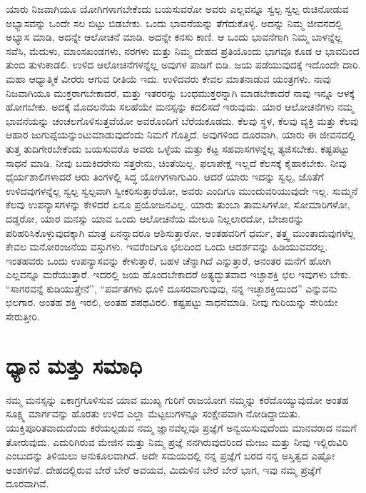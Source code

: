 ಯಾರು ನಿಜವಾಗಿಯೂ ಯೋಗಿಗಳಾಗಬೇಕೆಂದು ಬಯಸುವರೋ ಅವರು ಎಲ್ಲವನ್ನೂ ಸ್ವಲ್ಪ ಸ್ವಲ್ಪ ರುಚಿನೋಡುವ ಅಭ್ಯಾಸವನ್ನು ಒಂದೇ ಸಲ ಬಿಟ್ಟು ಬಿಡಬೇಕು. ಒಂದು ಭಾವನೆಯನ್ನು ತೆಗೆದುಕೊಳ್ಳಿ. ಅದನ್ನು ನಿಮ್ಮ ಜೀವನದಲ್ಲಿ ಅಭ್ಯಾಸ ಮಾಡಿ, ಅದನ್ನೇ ಆಲೋಚನೆ ಮಾಡಿ. ಅದನ್ನೇ ಕನಸು ಕಾಣಿ. ಆ ಒಂದು ಭಾವನೆಗಾಗಿ ನಿಮ್ಮ ಬಾಳನ್ನೆಲ್ಲ ಸವೆಸಿ, ಮೆದುಳು, ಮಾಂಸಖಂಡಗಳು, ನರಗಳು ಮತ್ತು ನಿಮ್ಮ ದೇಹದ ಪ್ರತಿಯೊಂದು ಭಾಗವೂ ಕೂಡ ಆ ಭಾವದಿಂದ ತುಂಬಿ ತುಳುಕಾಡಲಿ. ಉಳಿದ ಆಲೋಚನೆಗಳನ್ನೆಲ್ಲ ಅವುಗಳ ಪಾಡಿಗೆ ಬಿಡಿ. ಜಯ ಪಡೆಯುವುದಕ್ಕೆ ಇದೊಂದೇ ದಾರಿ. ಮಹಾ ಆಧ್ಯಾತ್ಮಿಕ ವೀರರು ಆಗುವ ರೀತಿಯೆ ಇದು. ಉಳಿದವರು ಕೇವಲ ಮಾತನಾಡುವ ಯಂತ್ರಗಳು. ನಾವು ನಿಜವಾಗಿಯೂ ಮುಕ್ತರಾಗಬೇಕಾದರೆ, ಮತ್ತು ಇತರರನ್ನು ಬಂಧಮುಕ್ತರನ್ನಾಗಿ ಮಾಡಬೇಕಾದರೆ ನಾವು ಇನ್ನೂ ಆಳಕ್ಕೆ ಹೋಗಬೇಕು. ಅದಕ್ಕೆ ಮೊದಲನೆಯ ಸಲಹೆಯೇ ಮನಸ್ಸನ್ನು ಕದಲಿಸದೆ ಇರುವುದು. ಯಾರ ಆಲೋಚನೆಗಳು ನಮ್ಮ ಭಾವನೆಯನ್ನು ಚಂಚಲಗೊಳಿಸುತ್ತವೆಯೋ ಅವರೊಂದಿಗೆ ಬೆರೆಯಕೂಡದು. ಕೆಲವು ಸ್ಥಳ, ಕೆಲವು ವ್ಯಕ್ತಿ ಮತ್ತು ಕೆಲವು ಆಹಾರ ಜುಗುಪ್ಸೆಯನ್ನುಂಟುಮಾಡುವುದೆಂದು ನಿಮಗೆ ಗೊತ್ತಿದೆ. ಅವುಗಳಿಂದ ದೂರವಾಗಿ, ಯಾರು ಈ ಜೀವನದಲ್ಲಿ ತುತ್ತ ತುದಿಗೇರಬೇಕೆಂದು ಬಯಸುವರೊ ಅವರು ಒಳ್ಳೆಯ ಮತ್ತು ಕೆಟ್ಟ ಸಹವಾಸಗಳನ್ನೆಲ್ಲ ತ್ಯಜಿಸಬೇಕು. ಕಷ್ಟಪಟ್ಟು ಸಾಧನೆ ಮಾಡಿ. ನೀವು ಬದುಕಿದರೇನು ಸತ್ತರೇನು, ಚಿಂತೆಯಿಲ್ಲ. ಫಲಾಪೇಕ್ಷೆ ಇಲ್ಲದೆ ಕೆಲಸಕ್ಕೆ ಕೈಹಾಕಬೇಕು. ನೀವು ಧೈರ್ಯಶಾಲಿಗಳಾದರೆ ಆರು ತಿಂಗಳಲ್ಲಿ ಸಿದ್ಧ ಯೋಗಿಗಳಾಗುವಿರಿ. ಆದರೆ ಯಾರು ಇದನ್ನು ಸ್ವಲ್ಪ, ಜೊತೆಗೆ ಉಳಿದವುಗಳನ್ನೆಲ್ಲ ಸ್ವಲ್ಪ ಸ್ವಲ್ಪವಾಗಿ ಸ್ವೀಕರಿಸುತ್ತಾರೆಯೋ, ಅವರು ಎಂದಿಗೂ ಮುಂದುವರಿಯುವುದೇ ಇಲ್ಲ. ಸುಮ್ಮನೆ ಕೆಲವು ಉಪನ್ಯಾಸಗಳನ್ನು ಕೇಳಿದರೆ ಏನೂ ಪ್ರಯೋಜನವಿಲ್ಲ. ಯಾರು ತುಂಬಾ ತಾಮಸಿಗಳೋ, ಸೋಮಾರಿಗಳೋ, ದಡ್ಡರೋ, ಯಾರ ಮನಸ್ಸು ಯಾವ ಒಂದು ಆಲೋಚನೆಯ ಮೇಲೂ ನಿಲ್ಲಲಾರದೋ, ಬೇಜಾರನ್ನು ಪರಿಹರಿಸಿಕೊಳ್ಳುವುದಕ್ಕಾಗಿ ಮಾತ್ರ ಏನನ್ನಾದರೂ ಆಶಿಸುತ್ತಾರೋ, ಅಂತಹವರಿಗೆ ಧರ್ಮ, ತತ್ತ್ವ ಮುಂತಾದುವುಗಳೆಲ್ಲ ಕೇವಲ ಮನೋರಂಜನೆಯ ವಸ್ತುಗಳು. ಇವರೆಂದಿಗೂ ಛಲದಿಂದ ಒಂದು ಆದರ್ಶವನ್ನು ಹಿಡಿಯುವವರಲ್ಲ. ಇಂತಹವರು ಒಂದು ಉಪನ್ಯಾಸವನ್ನು ಕೇಳುತ್ತಾರೆ, ಬಹಳ ಚೆನ್ನಾಗಿದೆ ಎನ್ನುತ್ತಾರೆ, ಅನಂತರ ಮನೆಗೆ ಹೋಗಿ ಎಲ್ಲವನ್ನೂ ಮರೆಯುತ್ತಾರೆ. ಇದರಲ್ಲಿ ಜಯ ಹೊಂದಬೇಕಾದರೆ ಅತ್ಯದ್ಭುತವಾದ ಇಚ್ಛಾಶಕ್ತಿ ಛಲ ಇವುಗಳು ಬೇಕು. “ಸಾಗರವನ್ನೆ ಕುಡಿಯುತ್ತೇನೆ”, “ಪರ್ವತಗಳು ಧೂಳಿ ದೂಸರವಾಗುವುವು, ನನ್ನ ಇಚ್ಛಾಶಕ್ತಿಯಿಂದ” ಎನ್ನುವನು ಛಲಗಾರ. ಅಂತಹ ಶಕ್ತಿ ಇರಲಿ, ಅಂತಹ ಶಪಥವಿರಲಿ. ಕಷ್ಟಪಟ್ಟು ಸಾಧನೆಮಾಡಿ. ನೀವು ಗುರಿಯನ್ನು ಸೇರಿಯೇ ಸೇರುತ್ತೀರಿ.

\chapter{ಧ್ಯಾನ ಮತ್ತು ಸಮಾಧಿ}

\vskip 0.2cm

ನಮ್ಮ ಮನಸ್ಸನ್ನು ಏಕಾಗ್ರಗೊಳಿಸುವ ಯಾವ ಮುಖ್ಯ ಗುರಿಗೆ ರಾಜಯೋಗ ನಮ್ಮನ್ನು ಕರೆದೊಯ್ಯುವುದೋ ಅಂತಹ ಸೂಕ್ಷ್ಮ ಮಾರ್ಗವನ್ನು ಹೊರತು ಉಳಿದ ಎಲ್ಲಾ ಮೆಟ್ಟಲುಗಳನ್ನೂ ಸಂಕ್ಷೇಪವಾಗಿ ನೋಡಿದ್ದಾಯಿತು. ಯುಕ್ತಿಪೂರಿತವಾದುದೆಂದು ಕರೆಯಲ್ಪಡುವ ನಮ್ಮ ಜ್ಞಾನವೆಲ್ಲವೂ ಪ್ರಜ್ಞೆಗೆ ಅನ್ವಯಿಸುವುದೆಂದು ಮಾನವರಾದ ನಮಗೆ ತೋರುವುದು. ಎದುರಿಗಿರುವ ಮೇಜಿನ ಮತ್ತು ನಿಮ್ಮ ಪ್ರಜ್ಞೆ ನನಗಿರುವುದರಿಂದ ಮೇಜು ಮತ್ತು ನೀವು ಇಲ್ಲಿರುವಿರಿ ಎಂಬುದನ್ನು ತಿಳಿಯಲು ಅನುಕೂಲವಾಗಿದೆ. ಅದೇ ಸಮಯದಲ್ಲಿ ನನ್ನ ಪ್ರಜ್ಞೆಗೆ ಬರದ ನನ್ನ ಅಸ್ತಿತ್ವದ ಎಷ್ಟೋ ಅಂಶಗಳಿವೆ. ದೇಹದಲ್ಲಿರುವ ಬೇರೆ ಬೇರೆ ಅವಯವ, ಮಿದುಳಿನ ಬೇರೆ ಬೇರೆ ಭಾಗ, ಇವು ನಮ್ಮ ಪ್ರಜ್ಞೆಗೆ ದೂರವಾಗಿವೆ. 

